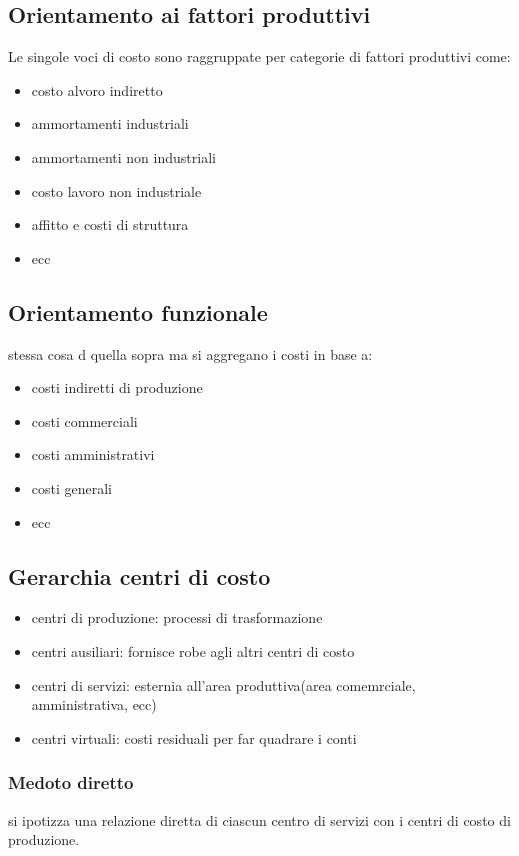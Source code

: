 \subsection{Orientamento ai fattori produttivi}
Le singole voci di costo sono raggruppate per categorie di fattori produttivi come:
\begin{itemize}
    \item costo alvoro indiretto
    \item ammortamenti industriali
    \item ammortamenti non industriali
    \item costo lavoro non industriale
    \item affitto e costi di struttura
    \item ecc
\end{itemize}

\subsection{Orientamento funzionale}
stessa cosa d quella sopra ma si aggregano i costi in base a:
\begin{itemize}
    \item costi indiretti di produzione
    \item costi commerciali
    \item costi amministrativi
    \item costi generali
    \item ecc
\end{itemize}

\subsection{Gerarchia centri di costo}
\begin{itemize}
    \item centri di produzione: processi di trasformazione
    \item centri ausiliari: fornisce robe agli altri centri di costo
    \item centri di servizi: esternia all'area produttiva(area comemrciale, amministrativa, ecc)
    \item centri virtuali: costi residuali per far quadrare i conti
\end{itemize}

\subsubsection{Medoto diretto}
si ipotizza una relazione diretta di ciascun centro
di servizi con i centri di costo di produzione.

